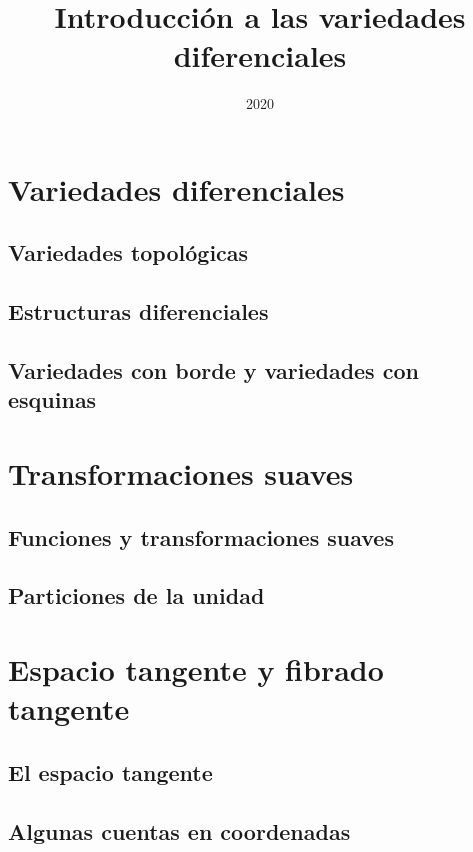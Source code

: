 \documentclass[11pt]{report}
\title{Introducci\'{o}n a las variedades diferenciales}
\author{}
\date{2020} %
\begin{document}
\maketitle

\tableofcontents


\chapter{Variedades diferenciales}
\section{Variedades topol\'{o}gicas}

%
\section{Estructuras diferenciales}

%
\section{Variedades con borde y variedades con esquinas}

%


\chapter{Transformaciones suaves}
\section{Funciones y transformaciones suaves}

%
\section{Particiones de la unidad}

%


\chapter{Espacio tangente y fibrado tangente}
\section{El espacio tangente}

%
\section{Algunas cuentas en coordenadas}

%
\end{document}
